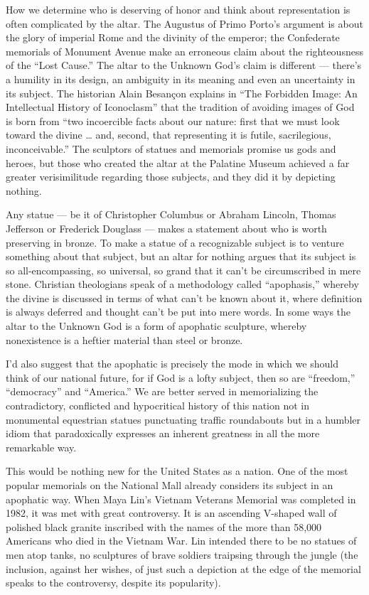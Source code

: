 How we determine who is deserving of honor and think about
representation is often complicated by the altar. The Augustus of Primo
Porto's argument is about the glory of imperial Rome and the divinity of
the emperor; the Confederate memorials of Monument Avenue make an
erroneous claim about the righteousness of the ``Lost Cause.'' The altar
to the Unknown God's claim is different --- there's a humility in its
design, an ambiguity in its meaning and even an uncertainty in its
subject. The historian Alain Besançon explains in ``The Forbidden Image:
An Intellectual History of Iconoclasm'' that the tradition of avoiding
images of God is born from ``two incoercible facts about our nature:
first that we must look toward the divine \ldots{} and, second, that
representing it is futile, sacrilegious, inconceivable.'' The sculptors
of statues and memorials promise us gods and heroes, but those who
created the altar at the Palatine Museum achieved a far greater
verisimilitude regarding those subjects, and they did it by depicting
nothing.

Any statue --- be it of Christopher Columbus or Abraham Lincoln, Thomas
Jefferson or Frederick Douglass --- makes a statement about who is worth
preserving in bronze. To make a statue of a recognizable subject is to
venture something about that subject, but an altar for nothing argues
that its subject is so all-encompassing, so universal, so grand that it
can't be circumscribed in mere stone. Christian theologians speak of a
methodology called ``apophasis,'' whereby the divine is discussed in
terms of what can't be known about it, where definition is always
deferred and thought can't be put into mere words. In some ways the
altar to the Unknown God is a form of apophatic sculpture, whereby
nonexistence is a heftier material than steel or bronze.

I'd also suggest that the apophatic is precisely the mode in which we
should think of our national future, for if God is a lofty subject, then
so are ``freedom,'' ``democracy'' and ``America.'' We are better served
in memorializing the contradictory, conflicted and hypocritical history
of this nation not in monumental equestrian statues punctuating traffic
roundabouts but in a humbler idiom that paradoxically expresses an
inherent greatness in all the more remarkable way.

This would be nothing new for the United States as a nation. One of the
most popular memorials on the National Mall already considers its
subject in an apophatic way. When Maya Lin's Vietnam Veterans Memorial
was completed in 1982, it was met with great controversy. It is an
ascending V-shaped wall of polished black granite inscribed with the
names of the more than 58,000 Americans who died in the Vietnam War. Lin
intended there to be no statues of men atop tanks, no sculptures of
brave soldiers traipsing through the jungle (the inclusion, against her
wishes, of just such a depiction at the edge of the memorial speaks to
the controversy, despite its popularity).

